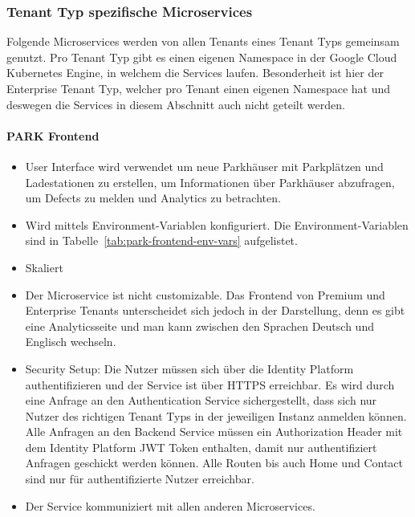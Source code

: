 \subsubsection{Tenant Typ spezifische Microservices}
Folgende Microservices werden von allen Tenants eines Tenant Typs gemeinsam genutzt. Pro Tenant Typ gibt es einen eigenen Namespace in der Google Cloud Kubernetes Engine, in welchem die Services laufen. Besonderheit ist hier der Enterprise Tenant Typ, welcher pro Tenant einen eigenen Namespace hat und deswegen die Services in diesem Abschnitt auch nicht geteilt werden.

\paragraph{PARK Frontend}
\begin{itemize}
	\item User Interface wird verwendet um neue Parkhäuser mit Parkplätzen und Ladestationen zu erstellen, um Informationen über Parkhäuser abzufragen, um Defects zu melden und Analytics zu betrachten.
	\item Wird mittels Environment-Variablen konfiguriert. Die Environment-Variablen sind in Tabelle~\ref{tab:park-frontend-env-vars} aufgelistet.
	\item Skaliert %
	\item Der Microservice ist nicht customizable. Das Frontend von Premium und Enterprise Tenants unterscheidet sich jedoch in der Darstellung, denn es gibt eine Analyticsseite und man kann zwischen den Sprachen Deutsch und Englisch wechseln.
	\item Security Setup: Die Nutzer müssen sich über die Identity Platform authentifizieren und der Service ist über HTTPS erreichbar. Es wird durch eine Anfrage an den Authentication Service sichergestellt, dass sich nur Nutzer des richtigen Tenant Typs in der jeweiligen Instanz anmelden können. Alle Anfragen an den Backend Service müssen ein Authorization Header mit dem Identity Platform JWT Token enthalten, damit nur authentifiziert Anfragen geschickt werden können. Alle Routen bis auch Home und Contact sind nur für authentifizierte Nutzer erreichbar.
	\item Der Service kommuniziert mit allen anderen Microservices.
\end{itemize}

